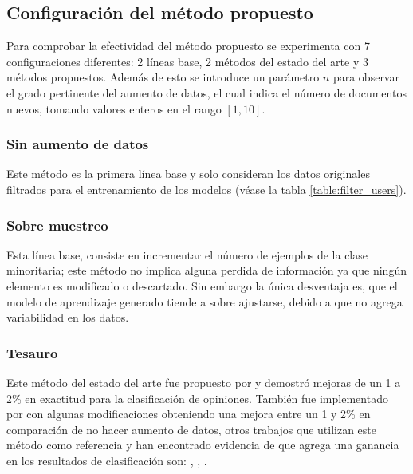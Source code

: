 

\subsection{Configuración del método propuesto}

Para comprobar la efectividad del método propuesto se experimenta con  7 configuraciones diferentes: 2 líneas base, 2 métodos del estado del arte y 3 métodos propuestos. Además de esto se introduce un parámetro $n$ para observar el grado pertinente del aumento de datos, el cual indica el número de documentos nuevos, tomando valores enteros en el rango $[1,10]$.



\subsubsection{Sin aumento de datos}
Este método es la primera línea base y solo consideran los datos originales filtrados para el entrenamiento de los modelos (véase la tabla \ref{table:filter_users}).

\subsubsection{Sobre muestreo}
Esta línea base, consiste en incrementar el número de ejemplos de la clase minoritaria; este método no implica alguna perdida de información ya que ningún elemento es modificado o descartado. Sin embargo la única desventaja es, que el modelo de aprendizaje generado tiende a sobre ajustarse, debido a que no agrega variabilidad en los datos.

\subsubsection{Tesauro}
Este método del estado del arte fue propuesto por \cite{zhang2015character} y demostró mejoras de un 1 a 2\% en exactitud para la clasificación de opiniones. También fue implementado por \cite{wei2019eda} con algunas modificaciones obteniendo una mejora entre un 1 y 2\% en comparación de no hacer aumento de datos, otros trabajos que utilizan este método como referencia y han encontrado evidencia de que agrega una ganancia en los resultados de clasificación son: \cite{jungiewicz2019towards}, \cite{kumar2019submodular}, \cite{park2019self}.


